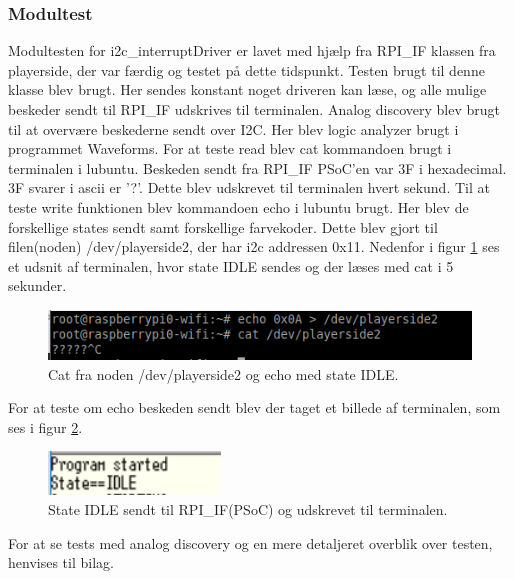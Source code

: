\documentclass[Rapport/RPi/RPI.tex]{subfiles}
\begin{document}
\subsubsection{Modultest}
Modultesten for i2c\_interruptDriver er lavet med hjælp fra RPI\_IF klassen fra playerside, der var færdig og testet på dette tidspunkt. Testen brugt til denne klasse blev brugt. Her sendes konstant noget driveren kan læse, og alle mulige beskeder sendt til RPI\_IF udskrives til terminalen. Analog discovery blev brugt til at overvære beskederne sendt over I2C. Her blev logic analyzer brugt i programmet Waveforms. For at teste read blev cat kommandoen brugt i terminalen i lubuntu. Beskeden sendt fra RPI\_IF PSoC'en var 3F i hexadecimal. 3F svarer i ascii er '?'. Dette blev udskrevet til terminalen hvert sekund. 
Til at teste write funktionen blev kommandoen echo i lubuntu brugt. Her blev de forskellige states sendt samt forskellige farvekoder. Dette blev gjort til filen(noden) /dev/playerside2, der har i2c addressen 0x11. Nedenfor i figur \ref{fig:echo_cat} ses et udsnit af terminalen, hvor state IDLE sendes og der læses med cat i 5 sekunder.
\begin{figure}[H]
    \centering 
    \includegraphics[width=0.5\linewidth]{Rapport/RPi/graphics/i2C_interruptDriver/cat_echo.png}
    \caption{Cat fra noden /dev/playerside2 og echo med state IDLE.}
    \label{fig:echo_cat}
\end{figure}
For at teste om echo beskeden sendt blev der taget et billede af terminalen, som ses i figur \ref{fig:echo_terminal}.
\begin{figure}[H]
    \centering 
    \includegraphics[width=0.4\linewidth]{Rapport/RPi/graphics/i2C_interruptDriver/echo_terminal.PNG}
    \caption{State IDLE sendt til RPI\_IF(PSoC) og udskrevet til terminalen.}
    \label{fig:echo_terminal}
\end{figure}
For at se tests med analog discovery og en mere detaljeret overblik over testen, henvises til bilag.
\end{document}
